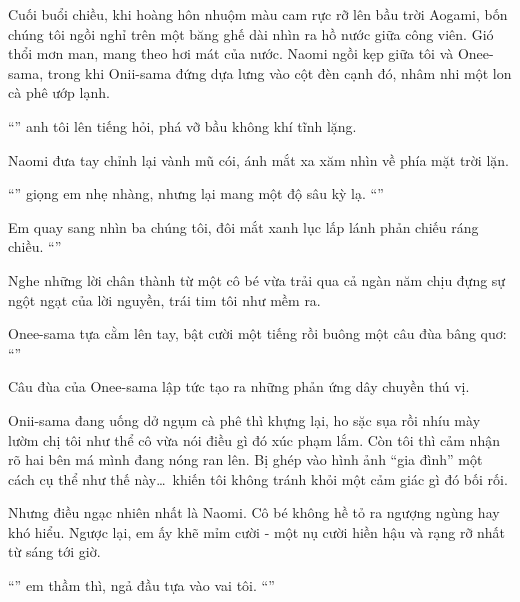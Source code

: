\documentclass[../main.tex]{subfiles}
\begin{document}
Cuối buổi chiều, khi hoàng hôn nhuộm màu cam rực rỡ lên bầu trời Aogami, bốn chúng tôi ngồi nghỉ trên một băng ghế dài nhìn ra hồ nước giữa công viên. Gió thổi mơn man, mang theo hơi mát của nước. Naomi ngồi kẹp giữa tôi và Onee-sama, trong khi Onii-sama đứng dựa lưng vào cột đèn cạnh đó, nhâm nhi một lon cà phê ướp lạnh.

``'' anh tôi lên tiếng hỏi, phá vỡ bầu không khí tĩnh lặng.

Naomi đưa tay chỉnh lại vành mũ cói, ánh mắt xa xăm nhìn về phía mặt trời lặn.

``'' giọng em nhẹ nhàng, nhưng lại mang một độ sâu kỳ lạ. ``''

Em quay sang nhìn ba chúng tôi, đôi mắt xanh lục lấp lánh phản chiếu ráng chiều. ``''

Nghe những lời chân thành từ một cô bé vừa trải qua cả ngàn năm chịu đựng sự ngột ngạt của lời nguyền, trái tim tôi như mềm ra.

Onee-sama tựa cằm lên tay, bật cười một tiếng rồi buông một câu đùa bâng quơ: ``''

Câu đùa của Onee-sama lập tức tạo ra những phản ứng dây chuyền thú vị.

Onii-sama đang uống dở ngụm cà phê thì khựng lại, ho sặc sụa rồi nhíu mày lườm chị tôi như thể cô vừa nói điều gì đó xúc phạm lắm. Còn tôi thì cảm nhận rõ hai bên má mình đang nóng ran lên. Bị ghép vào hình ảnh ``gia đình'' một cách cụ thể như thế này\dots\ khiến tôi không tránh khỏi một cảm giác gì đó bối rối.

Nhưng điều ngạc nhiên nhất là Naomi. Cô bé không hề tỏ ra ngượng ngùng hay khó hiểu. Ngược lại, em ấy khẽ mỉm cười - một nụ cười hiền hậu và rạng rỡ nhất từ sáng tới giờ.

``'' em thầm thì, ngả đầu tựa vào vai tôi. ``''
\end{document}
